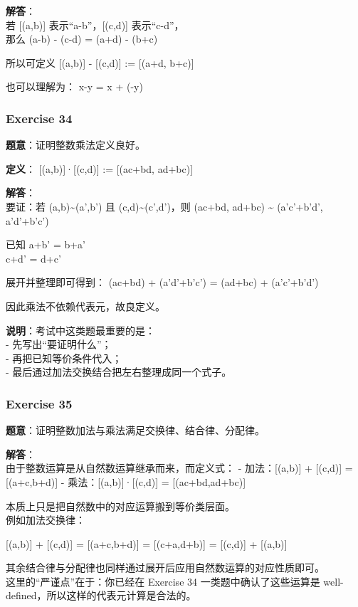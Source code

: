 \documentclass[
  11pt,
]{article}
\begin{document}
\textbf{解答}：\\
若 {[}(a,b){]} 表示``a-b''，{[}(c,d){]} 表示``c-d''，\\
那么 (a-b) - (c-d) = (a+d) - (b+c)

所以可定义 {[}(a,b){]} - {[}(c,d){]} := {[}(a+d, b+c){]}

也可以理解为： x-y = x + (-y)

\subsubsection{Exercise 34}\label{exercise-34}

\textbf{题意}：证明整数乘法定义良好。

\textbf{定义}： {[}(a,b){]}·{[}(c,d){]} := {[}(ac+bd, ad+bc){]}

\textbf{解答}：\\
要证：若 (a,b)\textasciitilde(a',b') 且 (c,d)\textasciitilde(c',d')，则
(ac+bd, ad+bc) \textasciitilde{} (a'c'+b'd', a'd'+b'c')

已知 a+b' = b+a'\\
c+d' = d+c'

展开并整理即可得到： (ac+bd) + (a'd'+b'c') = (ad+bc) + (a'c'+b'd')

因此乘法不依赖代表元，故良定义。

\textbf{说明}：考试中这类题最重要的是：\\
- 先写出``要证明什么''；\\
- 再把已知等价条件代入；\\
- 最后通过加法交换结合把左右整理成同一个式子。

\subsubsection{Exercise 35}\label{exercise-35}

\textbf{题意}：证明整数加法与乘法满足交换律、结合律、分配律。

\textbf{解答}：\\
由于整数运算是从自然数运算继承而来，而定义式： - 加法：{[}(a,b){]} +
{[}(c,d){]} = {[}(a+c,b+d){]} - 乘法：{[}(a,b){]}·{[}(c,d){]} =
{[}(ac+bd,ad+bc){]}

本质上只是把自然数中的对应运算搬到等价类层面。\\
例如加法交换律：

{[}(a,b){]} + {[}(c,d){]} = {[}(a+c,b+d){]} = {[}(c+a,d+b){]} =
{[}(c,d){]} + {[}(a,b){]}

其余结合律与分配律也同样通过展开后应用自然数运算的对应性质即可。\\
这里的``严谨点''在于：你已经在 Exercise 34 一类题中确认了这些运算是
well-defined，所以这样的代表元计算是合法的。
\end{document}
